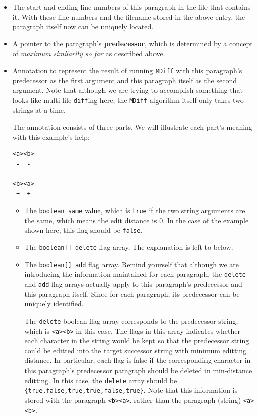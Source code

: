 \documentclass{article}
\begin{document}
\begin{enumerate}
\begin{itemize}
    \item The start and ending line numbers of this paragraph in the file that contains it. With these line numbers and the filename stored in the above entry, the paragraph itself now can be uniquely located.
    \item A pointer to the paragraph's \textbf{predecessor}, which is determined by a concept of \textit{maximum similarity so far} as described above.
    \item Annotation to represent the result of running \texttt{MDiff} with this paragraph's predecessor as the first argument and this paragraph itself as the second argument. Note that although we are trying to accomplish something that looks like multi-file \texttt{diff}ing here, the \texttt{MDiff} algorithm itself only takes two strings at a time. 

    The annotation consists of three parts. We will illustrate each part's meaning with this example's help:
    \begin{lstlisting}
<a><b>
 -  -

<b><a>
 +  +
    \end{lstlisting}
    \begin{itemize}
      \item The \texttt{boolean same} value, which is \texttt{true} if the two string arguments are the same, which means the edit distance is 0. In the case of the example shown here, this flag should be \texttt{false}.
      \item The \texttt{boolean[] delete} flag array. The explanation is left to below.
      \item The \texttt{boolean[] add} flag array. Remind yourself that although we are introducing the information maintained for each paragraph, the \texttt{delete} and \texttt{add} flag arrays actually apply to this paragraph's predecessor and this paragraph itself. Since for each paragraph, its predecessor can be uniquely identified.

      The \texttt{delete} boolean flag array corresponds to the predecessor string, which is \texttt{<a><b>} in this case. The flags in this array indicates whether each character in the string would be kept so that the predecessor string could be editted into the target successor string with minimum editting distance. In particular, each flag is false if the corresponding character in this paragraph's predecessor paragraph should be deleted in min-distance editting. In this case, the \texttt{delete} array should be \texttt{\{true,false,true,true,false,true\}}. Note that this information is stored with the paragraph \texttt{<b><a>}, rather than the paragraph (string) \texttt{<a><b>}.


\end{itemize}
\end{itemize}
\end{enumerate}
\end{document}
